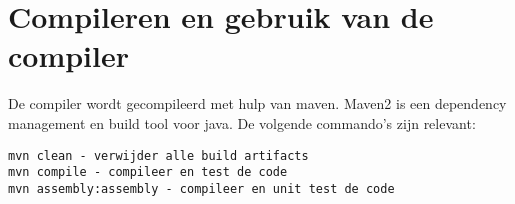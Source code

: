 \section{Compileren en gebruik van de compiler}
De compiler wordt gecompileerd met hulp van maven. Maven2 is een dependency management en build tool voor java. De volgende commando's zijn relevant:

\begin{verbatim}
mvn clean - verwijder alle build artifacts
mvn compile - compileer en test de code
mvn assembly:assembly - compileer en unit test de code
\end{verbatim}